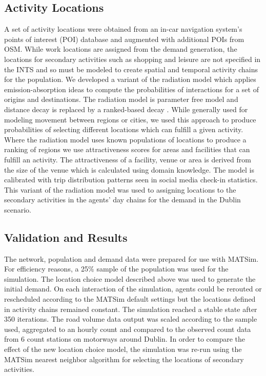 \subsection{Activity Locations}
A set of activity locations were obtained from an in-car navigation system’s points of interest (POI) database and augmented with additional POIs from OSM. While work locations are assigned from the demand generation, the locations for secondary activities such as shopping and leisure are not specified in the INTS and so must be modeled to create spatial and temporal activity chains for the population. We developed a variant of the radiation model which applies emission-absorption ideas to compute the probabilities of interactions for a set of origins and destinations. The radiation model is parameter free model and distance decay is replaced by a ranked-based decay \citep[][]{SiminiEtAl_NAT_2012}. While generally used for modeling movement between regions or cities, we used this approach to produce probabilities of selecting different locations which can fulfill a given activity. Where the radiation model uses known populations of locations to produce a ranking of regions we use attractiveness scores for areas and facilities that can fulfill an activity.  The attractiveness of a facility, venue or area is derived from the size of the venue which is calculated using domain knowledge. The model is calibrated with trip distribution patterns seen in social media check-in statistics. This variant of the radiation model was used to assigning locations to the secondary activities in the agents’ day chains for the demand in the Dublin scenario.

\subsection{Validation and Results}
The network, population and demand data were prepared for use with MATSim. For efficiency reasons, a 25\% sample of the population was used for the simulation. The location choice model described above was used to generate the initial demand. On each interaction of the simulation, agents could be rerouted or rescheduled according to the MATSim default settings but the locations defined in activity chains remained constant. The simulation reached a stable state after 350 iterations. The road volume data output was scaled according to the sample used, aggregated to an hourly count and compared to the observed count data from 6 count stations on motorways around Dublin. In order to compare the effect of the new location choice model, the simulation was re-run using the MATSim nearest neighbor algorithm for selecting the locations of secondary activities.

